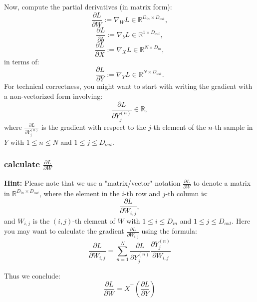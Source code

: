 \documentclass[lang=cn,11pt]{elegantbook}
\begin{document}
Now, compute the partial derivatives (in matrix form):
\begin{equation}
    \frac{\partial L}{\partial W} :=\nabla_W L \in \mathbb{R}^{D_{in} \times D_{out}},
\end{equation}
\begin{equation}
    \frac{\partial L}{\partial b} :=\nabla_b L \in \mathbb{R}^{1 \times D_{out}},
\end{equation}
\begin{equation}
    \frac{\partial L}{\partial X} := \nabla_X L \in \mathbb{R}^{N \times D_{in}},
\end{equation}
in terms of:
\begin{equation}
    \frac{\partial L}{\partial Y}:= \nabla_Y L \in \mathbb{R}^{N \times D_{out}}.
\end{equation}
For technical correctness, you might want to start with writing the gradient with a non-vectorized form involving:
\begin{equation}
    \frac{\partial L}{\partial Y^{(n)}_j} \in \mathbb{R},
\end{equation}
where $\frac{\partial L}{\partial Y^{(n)}_j}$ is the gradient with respect to the $j$-th element of the $n$-th sample in $Y$ with $1 \leq n \leq N$ and $1 \leq j \leq D_{out}$.

\subsubsection*{calculate $\frac{\partial L}{\partial W}$}
\textbf{Hint: }Please note that we use a "matrix/vector" notation $\frac{\partial L}{\partial W}$ to denote a matrix in $\mathbb{R}^{D_{in} \times D_{out}}$, where the element in the $i$-th row and $j$-th column is:
\begin{equation}
    \frac{\partial L}{\partial W_{i,j}},
\end{equation}
and $W_{i,j}$ is the $(i,j)$-th element of $W$ with \( 1 \leq i \leq D_{in} \) and \( 1 \leq j \leq D_{out} \). Here you may want to calculate the gradient \( \frac{\partial L}{\partial W_{i,j}} \) using the formula: \[
\frac{\partial L}{\partial W_{i,j}} = \sum_{n=1}^{N} \frac{\partial L}{\partial Y_j^{(n)}} \frac{\partial Y_j^{(n)}}{\partial W_{i,j}}
\]
\begin{solution}
    Thus we conclude: \[
    \frac{\partial L}{\partial W} = X^\top (\frac{\partial L }{\partial Y})
    \]
\end{solution}
\end{document}
